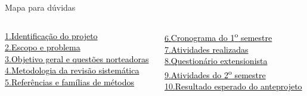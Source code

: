 \documentclass[aspectratio=1610,11pt]{beamer}
\newcommand{\maplink}[3]{\hyperlink{#2}{\textcolor{uspblue}{#1.}\hspace{0.35em}\textcolor{black}{#3}}}
\begin{document}
\begin{frame}{Mapa para dúvidas}
    \begin{columns}[T,onlytextwidth]
        \begin{column}{0.47\textwidth}
            \small
            \maplink{1}{fr-capa}{Identificação do projeto}\\[0.18cm]
            \maplink{2}{fr-escopo}{Escopo e problema}\\[0.18cm]
            \maplink{3}{fr-objetivos}{Objetivo geral e questões norteadoras}\\[0.18cm]
            \maplink{4}{fr-metodologia}{Metodologia da revisão sistemática}\\[0.18cm]
            \maplink{5}{fr-referencias}{Referências e famílias de métodos}
        \end{column}
        \begin{column}{0.47\textwidth}
            \small
            \maplink{6}{fr-cronograma}{Cronograma do 1\textsuperscript{o} semestre}\\[0.18cm]
            \maplink{7}{fr-realizadas}{Atividades realizadas}\\[0.18cm]
            \maplink{8}{fr-extensionista}{Questionário extensionista}\\[0.18cm]
            \maplink{9}{fr-segundo-semestre}{Atividades do 2\textsuperscript{o} semestre}\\[0.18cm]
            \maplink{10}{fr-segundo-semestre}{Resultado esperado do anteprojeto}
        \end{column}
    \end{columns}


\end{frame}
\end{document}
